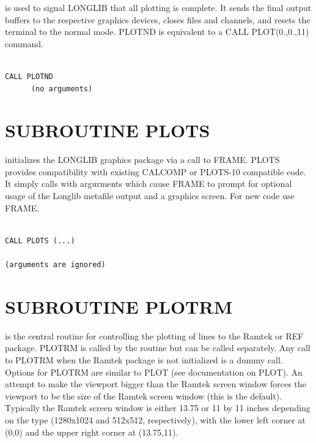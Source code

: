 \documentclass[11pt]{report}
\begin{document}
 is used to signal LONGLIB that all plotting is complete.  It
sends the final output buffers to the respective graphics devices, closes
files and channels, and resets the terminal to the normal  mode.  PLOTND
is equivalent to a CALL PLOT(0.,0.,11) command.
\begin{verbatim}

CALL PLOTND
      (no arguments)
\end{verbatim}

\section{SUBROUTINE PLOTS}

 initializes the LONGLIB graphics package via a call to FRAME.
PLOTS provides compatibility with existing CALCOMP or PLOTS-10 compatible
code.  It simply calls  with argurments which cause FRAME to prompt
for optional usage of the Longlib metafile output and a graphics
screen.  For new code use FRAME.
\begin{verbatim}

CALL PLOTS (...)

(arguments are ignored)
\end{verbatim}

\section{SUBROUTINE PLOTRM}

 is the central routine for controlling the plotting of lines to
the Ramtek or REF package.  PLOTRM is called by the  routine but
can be called separately.  Any call to PLOTRM when the Ramtek package
is not initialized is a dummy call.  Options for PLOTRM are similar
to PLOT (see documentation on PLOT).
An attempt to make the viewport bigger than the Ramtek screen window
forces the viewport to be the size of the Ramtek screen window
(this is the default).  Typically the Ramtek screen window is
either 13.75 or 11 by 11 inches depending on the type (1280x1024 and
512x512, respectively), with the lower
left corner at (0,0) and the upper right corner at (13.75,11).
\end{document}
